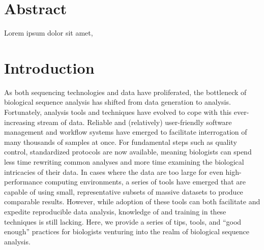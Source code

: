 \documentclass[10pt,letterpaper]{article}
\begin{document}
\section*{Abstract}
Lorem ipsum dolor sit amet, %




\linenumbers

\section*{Introduction}

As both sequencing technologies and data have proliferated, the bottleneck of biological sequence analysis has shifted from data generation to analysis. Fortunately, analysis tools and techniques have evolved to cope with this ever-increasing stream of data. Reliable and (relatively) user-friendly software management and workflow systems have emerged to facilitate interrogation of many thousands of samples at once. For fundamental steps such as quality control, standardized protocols are now available, meaning biologists can spend less time rewriting common analyses and more time examining the biological intricacies of their data. In cases where the data are too large for even high-performance computing environments, a series of tools have emerged that are capable of using small, representative subsets of massive datasets to produce comparable results. However, while adoption of these tools can both facilitate and expedite reproducible data analysis, knowledge of and training in these techniques is still lacking. Here, we provide a series of tips, tools, and “good enough” practices for biologists venturing into the realm of biological sequence analysis.
\end{document}
